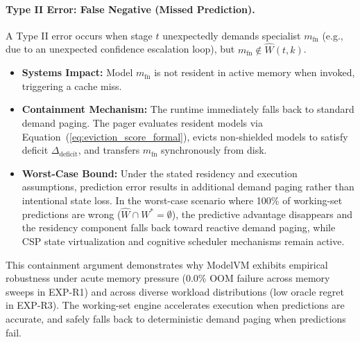 \paragraph{Type II Error: False Negative (Missed Prediction).}
A Type II error occurs when stage $t$ unexpectedly demands specialist $m_{\text{fn}}$ (e.g., due to an unexpected confidence escalation loop), but $m_{\text{fn}} \notin \widehat{W}(t, k)$.
\begin{itemize}
    \item \textbf{Systems Impact:} Model $m_{\text{fn}}$ is not resident in active memory when invoked, triggering a cache miss.
    \item \textbf{Containment Mechanism:} The runtime immediately falls back to standard demand paging. The pager evaluates resident models via Equation~(\ref{eq:eviction_score_formal}), evicts non-shielded models to satisfy deficit $\Delta_{\text{deficit}}$, and transfers $m_{\text{fn}}$ synchronously from disk.
    \item \textbf{Worst-Case Bound:} Under the stated residency and execution assumptions, prediction error results in additional demand paging rather than intentional state loss. In the worst-case scenario where 100\% of working-set predictions are wrong ($\widehat{W} \cap W^* = \emptyset$), the predictive advantage disappears and the residency component falls back toward reactive demand paging, while CSP state virtualization and cognitive scheduler mechanisms remain active.
\end{itemize}

This containment argument demonstrates why ModelVM exhibits empirical robustness under acute memory pressure (0.0\% OOM failure across memory sweeps in EXP-R1) and across diverse workload distributions (low oracle regret in EXP-R3). The working-set engine accelerates execution when predictions are accurate, and safely falls back to deterministic demand paging when predictions fail.
